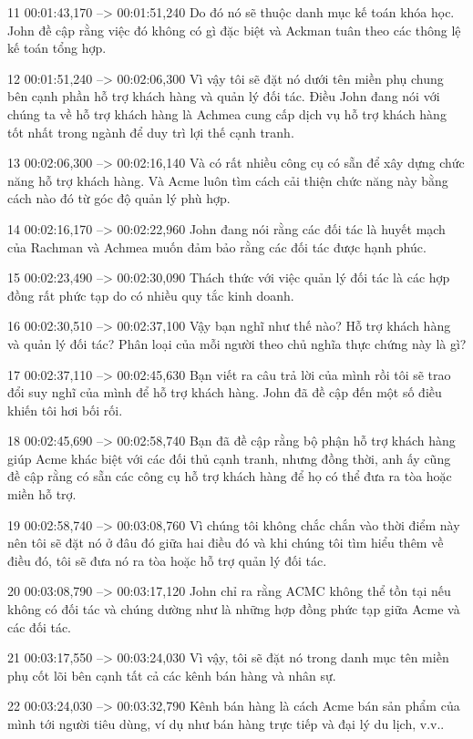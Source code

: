 11
00:01:43,170 --> 00:01:51,240
Do đó nó sẽ thuộc danh mục kế toán khóa học.  John đề cập rằng việc đó không có gì đặc biệt và Ackman tuân theo các thông lệ kế toán tổng hợp.

12
00:01:51,240 --> 00:02:06,300
Vì vậy tôi sẽ đặt nó dưới tên miền phụ chung bên cạnh phần hỗ trợ khách hàng và quản lý đối tác.  Điều John đang nói với chúng ta về hỗ trợ khách hàng là Achmea cung cấp dịch vụ hỗ trợ khách hàng tốt nhất trong ngành để duy trì lợi thế cạnh tranh.

13
00:02:06,300 --> 00:02:16,140
Và có rất nhiều công cụ có sẵn để xây dựng chức năng hỗ trợ khách hàng.  Và Acme luôn tìm cách cải thiện chức năng này bằng cách nào đó từ góc độ quản lý phù hợp.

14
00:02:16,170 --> 00:02:22,960
John đang nói rằng các đối tác là huyết mạch của Rachman và Achmea muốn đảm bảo rằng các đối tác được hạnh phúc.

15
00:02:23,490 --> 00:02:30,090
Thách thức với việc quản lý đối tác là các hợp đồng rất phức tạp do có nhiều quy tắc kinh doanh.

16
00:02:30,510 --> 00:02:37,100
Vậy bạn nghĩ như thế nào?  Hỗ trợ khách hàng và quản lý đối tác?  Phân loại của mỗi người theo chủ nghĩa thực chứng này là gì?

17
00:02:37,110 --> 00:02:45,630
Bạn viết ra câu trả lời của mình rồi tôi sẽ trao đổi suy nghĩ của mình để hỗ trợ khách hàng.  John đã đề cập đến một số điều khiến tôi hơi bối rối.

18
00:02:45,690 --> 00:02:58,740
Bạn đã đề cập rằng bộ phận hỗ trợ khách hàng giúp Acme khác biệt với các đối thủ cạnh tranh, nhưng đồng thời, anh ấy cũng đề cập rằng có sẵn các công cụ hỗ trợ khách hàng để họ có thể đưa ra tòa hoặc miền hỗ trợ.

19
00:02:58,740 --> 00:03:08,760
Vì chúng tôi không chắc chắn vào thời điểm này nên tôi sẽ đặt nó ở đâu đó giữa hai điều đó và khi chúng tôi tìm hiểu thêm về điều đó, tôi sẽ đưa nó ra tòa hoặc hỗ trợ quản lý đối tác.

20
00:03:08,790 --> 00:03:17,120
John chỉ ra rằng ACMC không thể tồn tại nếu không có đối tác và chúng dường như là những hợp đồng phức tạp giữa Acme và các đối tác.

21
00:03:17,550 --> 00:03:24,030
Vì vậy, tôi sẽ đặt nó trong danh mục tên miền phụ cốt lõi bên cạnh tất cả các kênh bán hàng và nhân sự.

22
00:03:24,030 --> 00:03:32,790
Kênh bán hàng là cách Acme bán sản phẩm của mình tới người tiêu dùng, ví dụ như bán hàng trực tiếp và đại lý du lịch, v.v..

